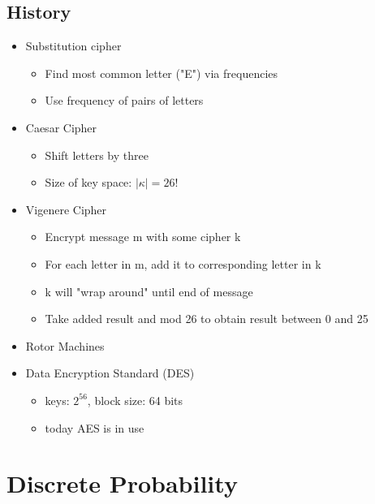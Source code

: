 \documentclass[]{article}
\begin{document}
\subsection{History}
\begin{itemize}
	\item Substitution cipher
	\begin{itemize}
		\item Find most common letter ("E") via frequencies
		\item Use frequency of pairs of letters
	\end{itemize}
	\item Caesar Cipher
	\begin{itemize}
		\item Shift letters by three
		\item Size of key space: $|\kappa| = 26!$
	\end{itemize}
	\item Vigenere Cipher
	\begin{itemize}
		\item Encrypt message m with some cipher k
		\item For each letter in m, add it to corresponding letter in k
		\item k will "wrap around" until end of message
		\item Take added result and mod 26 to obtain result between 0 and 25
	\end{itemize}
	\item Rotor Machines
	\item Data Encryption Standard (DES)
	\begin{itemize}
		\item keys: $2^{56}$, block size: 64 bits
		\item today AES is in use
	\end{itemize}
\end{itemize}
\section{Discrete Probability}
\end{document}

